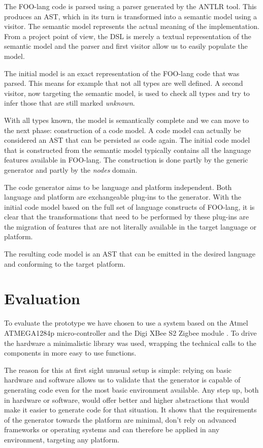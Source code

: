 \documentclass[conference]{IEEEtran}
\begin{document}
The FOO-lang code is parsed using a parser generated by the ANTLR tool. This
produces an AST, which in its turn is transformed into a semantic model using a
visitor. The semantic model represents the actual meaning of the
implementation. From a project point of view, the DSL is merely a textual
representation of the semantic model and the parser and first visitor allow us
to easily populate the model.

The initial model is an exact representation of the FOO-lang code that was
parsed. This means for example that not all types are well defined. A second
visitor, now targeting the semantic model, is used to check all types and try
to infer those that are still marked \emph{unknown}.

With all types known, the model is semantically complete and we can move to the
next phase: construction of a code model. A code model can actually be
considered an AST that can be persisted as code again. The initial code model
that is constructed from the semantic model typically contains all the language
features available in FOO-lang. The construction is done partly by the generic
generator and partly by the \emph{nodes} domain.

The code generator aims to be language and platform independent. Both language
and platform are exchangeable plug-ins to the generator. With the initial code
model based on the full set of language constructs of FOO-lang, it is clear
that the transformations that need to be performed by these plug-ins are the
migration of features that are not literally available in the target language
or platform.

The resulting code model is an AST that can be emitted in the desired language
and conforming to the target platform.

\section{Evaluation}
\label{section:evaluation}

To evaluate the prototype we have chosen to use a system based on the Atmel
ATMEGA1284p micro-controller \cite{datasheet:atmega1284p} and the Digi XBee S2
Zigbee module \cite{manual:xbee}. To drive the hardware a minimalistic library
was used, wrapping the technical calls to the components in more easy to use
functions.

The reason for this at first sight unusual setup is simple: relying on basic
hardware and software allows us to validate that the generator is capable of
generating code even for the most basic environment available. Any step up,
both in hardware or software, would offer better and higher abstractions that
would make it easier to generate code for that situation. It shows that the
requirements of the generator towards the platform are minimal, don't rely on
advanced frameworks or operating systems and can therefore be applied in any
environment, targeting any platform.
\end{document}
